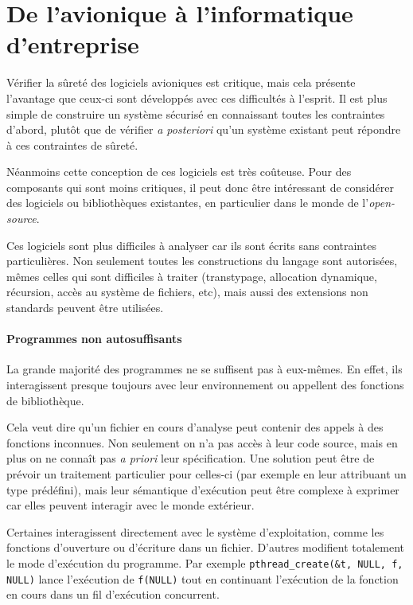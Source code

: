
\section{De l'avionique à l'informatique d'entreprise}

Vérifier la sûreté des logiciels avioniques est critique, mais cela présente
l'avantage que ceux-ci sont développés avec ces difficultés à l'esprit. Il est
plus simple de construire un système sécurisé en connaissant toutes les
contraintes d'abord, plutôt que de vérifier \emph{a posteriori} qu'un système
existant peut répondre à ces contraintes de sûreté.

Néanmoins cette conception de ces logiciels est très coûteuse. Pour des
composants qui sont moins critiques, il peut donc être intéressant de considérer
des logiciels ou bibliothèques existantes, en particulier dans le monde de
l'\emph{open-source}.

Ces logiciels sont plus difficiles à analyser car ils sont écrits sans
contraintes particulières. Non seulement toutes les constructions du langage
sont autorisées, mêmes celles qui sont difficiles à traiter (transtypage,
allocation dynamique, récursion, accès au système de fichiers, etc), mais aussi
des extensions non standards peuvent être utilisées.

\paragraph{Programmes non autosuffisants}

La grande majorité des programmes ne se suffisent pas à eux-mêmes. En effet, ils
interagissent presque toujours avec leur environnement ou appellent des
fonctions de bibliothèque.

Cela veut dire qu'un fichier en cours d'analyse peut contenir des appels à des
fonctions inconnues. Non seulement on n'a pas accès à leur code source, mais en
plus on ne connaît pas \emph{a priori} leur spécification. Une solution peut
être de prévoir un traitement particulier pour celles-ci (par exemple en leur
attribuant un type prédéfini), mais leur sémantique d'exécution peut être
complexe à exprimer car elles peuvent interagir avec le monde extérieur.

Certaines interagissent directement avec le système d'exploitation, comme les
fonctions d'ouverture ou d'écriture dans un fichier. D'autres modifient
totalement le mode d'exécution du programme. Par exemple
\texttt{pthread\_create(\&t, NULL, f, NULL)} lance l'exécution de
\texttt{f(NULL)} tout en continuant l'exécution de la fonction en cours
dans un fil d'exécution concurrent.

